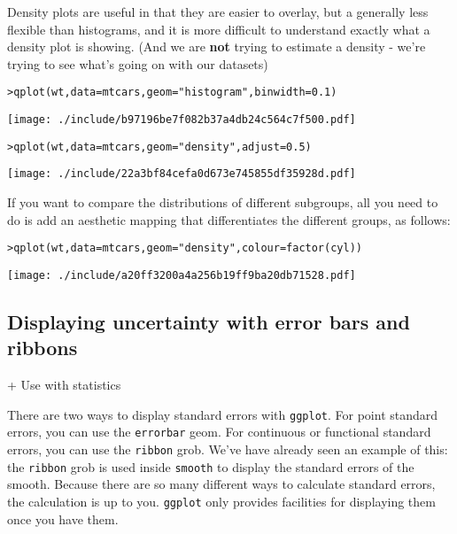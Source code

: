 Density plots are useful in that they are easier to overlay, but a generally less flexible than histograms, and it is more difficult to understand exactly what a density plot is showing.  (And we are {\bf not} trying to estimate a density - we're trying to see what's going on with our datasets)

\begin{alltt}
> qplot(wt, data = mtcars, geom = "histogram", binwidth = 0.1)
\end{alltt}
\texttt{[image: ./include/b97196be7f082b37a4db24c564c7f500.pdf]}
\begin{alltt}

> qplot(wt, data = mtcars, geom = "density", adjust = 0.5)
\end{alltt}
\texttt{[image: ./include/22a3bf84cefa0d673e745855df35928d.pdf]}
\begin{alltt}

\end{alltt}

If you want to compare the distributions of different subgroups, all you need to do is add an aesthetic mapping that differentiates the different groups, as follows:

\begin{alltt}
> qplot(wt, data = mtcars, geom = "density", colour = factor(cyl))
\end{alltt}
\texttt{[image: ./include/a20ff3200a4a256b19ff9ba20db71528.pdf]}
\begin{alltt}

\end{alltt}

\subsection{Displaying uncertainty with error bars and ribbons}\label{sub:error_bars}

+ Use with statistics

There are two ways to display standard errors with {\tt ggplot}.  For point standard errors, you can use the {\tt errorbar} geom.  For continuous or functional standard errors, you can use the {\tt ribbon} grob.  We've have already seen an example of this: the {\tt ribbon} grob is used inside {\tt smooth} to display the standard errors of the smooth.  Because there are so many different ways to calculate standard errors, the calculation is up to you.  {\tt ggplot} only provides facilities for displaying them once you have them.

